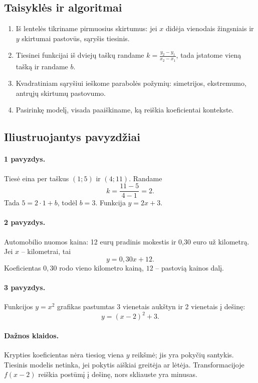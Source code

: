 \subsection{Taisyklės ir algoritmai}

\begin{enumerate}
\item Iš lentelės tikriname pirmuosius skirtumus: jei $x$ didėja vienodais žingsniais ir $y$ skirtumai pastovūs, sąryšis tiesinis.
\item Tiesinei funkcijai iš dviejų taškų randame $k=\frac{y_2-y_1}{x_2-x_1}$, tada įstatome vieną tašką ir randame $b$.
\item Kvadratiniam sąryšiui ieškome parabolės požymių: simetrijos, ekstremumo, antrųjų skirtumų pastovumo.
\item Pasirinkę modelį, visada paaiškiname, ką reiškia koeficientai kontekste.
\end{enumerate}

\subsection{Iliustruojantys pavyzdžiai}

\paragraph{1 pavyzdys.}
Tiesė eina per taškus $(1;5)$ ir $(4;11)$. Randame
\[
k=\frac{11-5}{4-1}=2.
\]
Tada $5=2\cdot1+b$, todėl $b=3$. Funkcija $y=2x+3$.

\paragraph{2 pavyzdys.}
Automobilio nuomos kaina: 12 eurų pradinis mokestis ir 0,30 euro už kilometrą. Jei $x$ -- kilometrai, tai
\[
y=0,30x+12.
\]
Koeficientas $0,30$ rodo vieno kilometro kainą, $12$ -- pastovią kainos dalį.

\paragraph{3 pavyzdys.}
Funkcijos $y=x^2$ grafikas pastumtas 3 vienetais aukštyn ir 2 vienetais į dešinę:
\[
y=(x-2)^2+3.
\]

\paragraph{Dažnos klaidos.}
Krypties koeficientas nėra tiesiog viena $y$ reikšmė; jis yra pokyčių santykis. Tiesinis modelis netinka, jei pokytis aiškiai greitėja ar lėtėja. Transformacijoje $f(x-2)$ reiškia postūmį į dešinę, nors skliauste yra minusas.

